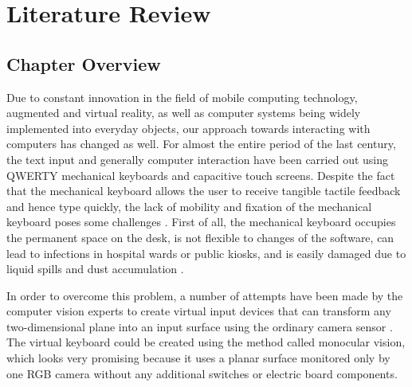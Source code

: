 \chapter{Literature Review}
\label{ch:literature_review}

\section{Chapter Overview}
\label{sec:lit_chapter_overview}
Due to constant innovation in the field of mobile computing technology, augmented and virtual reality, as well as computer systems being widely implemented into everyday objects, our approach towards interacting with computers has changed as well. For almost the entire period of the last century, the text input and generally computer interaction have been carried out using QWERTY mechanical keyboards and capacitive touch screens. Despite the fact that the mechanical keyboard allows the user to receive tangible tactile feedback and hence type quickly, the lack of mobility and fixation of the mechanical keyboard poses some challenges \cite{ReviewVirtualKeyboard2020, Lee2022Virtual}. First of all, the mechanical keyboard occupies the permanent space on the desk, is not flexible to changes of the software, can lead to infections in hospital wards or public kiosks, and is easily damaged due to liquid spills and dust accumulation \cite{ReviewVirtualKeyboard2020}.

In order to overcome this problem, a number of attempts have been made by the computer vision experts to create virtual input devices that can transform any two-dimensional plane into an input surface using the ordinary camera sensor \cite{Zhang2001Visual, Srivastava2012RealTime, Khare2019QWERTY, Maman2023TypeNet}. The virtual keyboard could be created using the method called monocular vision, which looks very promising because it uses a planar surface monitored only by one RGB camera without any additional switches or electric board components.

